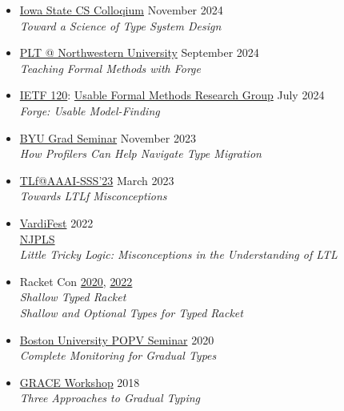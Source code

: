 \documentclass[11pt]{article}
\begin{document}
\begin{itemize}
  \item
    \href{https://www.cs.iastate.edu/event/2024/cs-colloquium-dr-ben-greenman}{Iowa State CS Colloqium} \hfill November 2024 \\
    \emph{Toward a Science of Type System Design}
  \item
    \href{https://plt.cs.northwestern.edu/}{PLT @ Northwestern University} \hfill September 2024 \\
    \emph{Teaching Formal Methods with Forge}
  \item
    \href{https://www.ietf.org/meeting/120/}{IETF 120}: \href{https://datatracker.ietf.org/meeting/120/materials/agenda-120-ufmrg-03}{Usable Formal Methods Research Group} \hfill July 2024 \\
    \emph{Forge: Usable Model-Finding}
  \item
    \href{https://cs.byu.edu/events/seminar-series/}{BYU Grad Seminar} \hfill November 2023 \\
    \emph{How Profilers Can Help Navigate Type Migration}
  \item
    \href{https://ltlf-symposium.github.io/}{TLf@AAAI-SSS'23} \hfill March 2023 \\
    \emph{Towards LTLf Misconceptions}
  \item
    \href{https://vardifest.github.io}{VardiFest} \hfill 2022\\
    \href{http://njpls.org/oct22.html}{NJPLS} \\
    \emph{Little Tricky Logic: Misconceptions in the Understanding of LT\/L}
  \item
    Racket Con \hfill \href{https://con.racket-lang.org/2020}{2020}, \href{https://con.racket-lang.org/2022}{2022}\\
    \emph{Shallow Typed Racket} \\
    \emph{Shallow and Optional Types for Typed Racket}
  \item
    \href{https://www.bu.edu/cs/research/popv/seminar/}{Boston University POPV Seminar} \hfill {2020}\\
    \emph{Complete Monitoring for Gradual Types}
  \item
    \href{https://2018.splashcon.org/track/grace-2018-papers}{GRACE Workshop} \hfill 2018\\
    \emph{Three Approaches to Gradual Typing}
\end{itemize}
\end{document}
